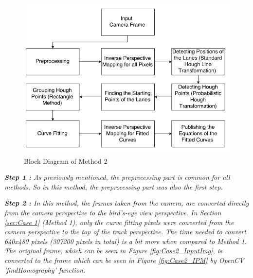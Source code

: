\begin{figure}[H]
 \centering
  \includegraphics[width=1\textwidth]{./Bilder/Case2_BlockDiagram.png}
	\caption{Block Diagram of Method 2}
	\label{fig:Case2_BlockDiagram}
\end{figure}

\emph{\color{green}\textbf{Step 1 : }As previously mentioned, the preprocessing part is common for all methods. So in this method, the preprocessing part was also the first step.}

\emph{\color{green}\textbf{Step 2 : }In this method, the frames taken from the camera, are converted directly from the camera perspective to the bird's-eye view perspective. In Section \ref{sec:Case 1} (Method 1), only the curve fitting pixels were converted from the camera perspective to the top of the track perspective. The time needed to convert 640x480 pixels (307200 pixels in total) is a bit more when compared to Method 1. The original frame, which can be seen in Figure \ref{fig:Case2_InputImg}, is converted to the frame which can be seen in Figure \ref{fig:Case2_IPM} by OpenCV 'findHomography' function.}

